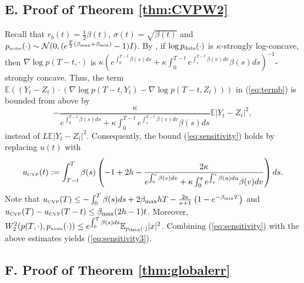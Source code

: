 \documentclass[letterpaper,10pt,reqno]{amsart}
\def\eqref#1{(\ref{#1})}
\numberwithin{equation}{section}
\begin{document}
\subsection*{E. Proof of Theorem \ref{thm:CVPW2}}

Recall that $r_b(t) = \frac{1}{2} \beta(t)$, $\sigma(t) = \sqrt{\beta(t)}$ and 
$p_{\tiny \mbox{noise}}(\cdot) \sim \mathcal{N}(0, (e^{\frac{T}{2} (\beta_{\max} + \beta_{\min})} - 1) I)$.
By \cite[Proposition 10]{GNZ23},
if $\log p_{\scalebox{0.7}{data}}(\cdot)$ is $\kappa$-strongly log-concave,
then $\nabla \log p(T-t, \cdot)$ is 
$\kappa \left(e^{\int_0^{T-t} \beta(s) ds}+ \kappa \int_0^{T-t}e^{\int_s^{T-t} \beta(v) dv} \beta(s) ds\right)^{-1}$-strongly concave.
Thus, the term $\mathbb{E}((Y_t - Z_t) \cdot (\nabla \log p(T-t, Y_t) - \nabla \log p(T-t, Z_t)))$ in \eqref{eq:termb} is bounded from above by
\begin{equation*}
    -\frac{\kappa}{e^{\int_0^{T-t} \beta(s) ds}+ \kappa \int_0^{T-t}e^{\int_s^{T-t} \beta(v) dv} \beta(s) ds} \mathbb{E}|Y_t - Z_t|^2,
\end{equation*}
instead of $L \mathbb{E}|Y_t - Z_t|^2$.
Consequently, 
the bound \eqref{eq:sensitivity} holds by replacing $u(t)$ with 
\begin{equation}
u_{\tiny \mbox{CVP}}(t): = \int_{T-t}^T \beta(s) \left(-1 + 2h - \frac{2 \kappa}{e^{\int_0^{s} \beta(v) dv}+ \kappa \int_0^{s}e^{ \int_v^{s} \beta(u) du} \beta(v) dv}\right) ds.
\end{equation}
Note that 
$u_{\tiny \mbox{CVP}}(T) \le - \int_{0}^T \beta(s) ds + 2  \beta_{\max} h T
- \frac{2 \kappa}{\kappa+1} \left(1 - e^{-\beta_{\min} T} \right)$
and 
$u_{\tiny \mbox{CVP}}(T) - u_{\tiny \mbox{CVP}}(T-t) \le \beta_{\max}(2h-1) t$.
Moreover, 
$W_2^2(p(T, \cdot), p_{\tiny \mbox{noise}}(\cdot)) 
\le e^{\int_0^T \beta(s)ds} \mathbb{E}_{p_{\tiny \mbox{data}}(\cdot)}|x|^2$.
Combining \eqref{eq:sensitivity} with the above estimates
yields \eqref{eq:sensitivity3}.

\subsection*{F. Proof of Theorem \ref{thm:globalerr}}
\end{document}

